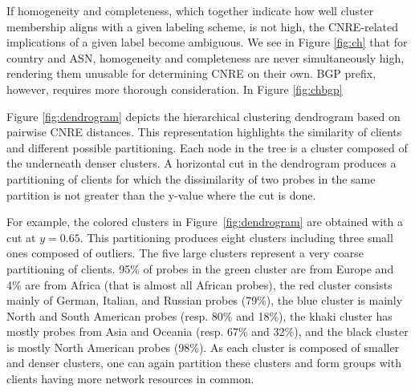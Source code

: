 If homogeneity and completeness, which together indicate how well cluster
membership aligns with a given labeling scheme, is not high, the CNRE-related
implications of a given label become ambiguous. We see in Figure \ref{fig:ch}
that for country and ASN, homogeneity and completeness are never simultaneously
high, rendering them unusable for determining CNRE on their own. BGP prefix,
however, requires more thorough consideration. In Figure \ref{fig:chbgp}



Figure \ref{fig:dendrogram} depicts the hierarchical clustering dendrogram based 
on pairwise CNRE distances.
This representation highlights the similarity of clients and different possible 
partitioning.
Each node in the tree is a cluster composed of the underneath denser clusters.
A horizontal cut in the dendrogram produces a partitioning of clients  for which
the dissimilarity of two probes in the same partition is not greater than the 
y-value where the cut is done. 

For example, the colored clusters in Figure~\ref{fig:dendrogram} are obtained 
with a cut at $y=0.65$.
This partitioning produces eight clusters including three small ones 
composed of outliers.
The five large clusters represent a very coarse partitioning of clients.
95\% of probes in the green cluster are from Europe and 4\% are from Africa 
(that is almost all African probes), the red cluster consists mainly of
German, Italian, and Russian probes (79\%), the blue cluster is mainly North and
South American probes (resp. 80\% and 18\%), the khaki cluster has mostly probes
from Asia and Oceania (resp. 67\% and 32\%), and the black cluster is mostly
North American probes (98\%).
As each cluster is composed of smaller and denser clusters, one can again partition
these clusters and form groups with clients having more network resources in common.
